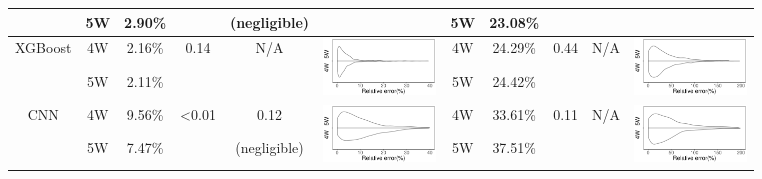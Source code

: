 \begin{landscape}
\begin{table}[htbp]
{\begin{tabular}{|c|c|c|c|c|c|c|c|c|c|c|}
\cline{2-3}\cline{7-8}          & \multirow{1}[5]{*}{5W}    & \multirow{1}[5]{*}{2.90\%} &       & (negligible) &       & \multirow{1}[5]{*}{5W}    & \multirow{1}[5]{*}{23.08\%} &       &       &  \\[4.5mm]
    \hline
    \multirow{2}[9]{*}{XGBoost} & \multirow{1}[5]{*}{4W}    & \multirow{1}[5]{*}{2.16\%} & \multirow{2}[9]{*}{0.14} & \multirow{2}[9]{*}{N/A} & \multirow{2}[4]{*}{\includegraphics[height=15mm,width=30mm]{openmrs_xgboost.pdf}} & \multirow{1}[5]{*}{4W}    & \multirow{1}[5]{*}{24.29\%} & \multirow{2}[9]{*}{0.44} & \multirow{2}[9]{*}{N/A} & \multirow{2}[4]{*}{\includegraphics[height=15mm,width=30mm]{jms_xgboost.pdf}} \\[4.5mm]
\cline{2-3}\cline{7-8}          & \multirow{1}[5]{*}{5W}    & \multirow{1}[5]{*}{2.11\%} &       &       &       & \multirow{1}[5]{*}{5W}    & \multirow{1}[5]{*}{24.42\%} &       &       &  \\[4.5mm]
    \hline
    \multirow{2}[9]{*}{CNN} & \multirow{1}[5]{*}{4W}    & \multirow{1}[5]{*}{9.56\%} & \multirow{2}[9]{*}{\textless 0.01} & \multirow{1}[10]{*}{0.12} & \multirow{2}[4]{*}{\includegraphics[height=15mm,width=30mm]{openmrs_cnn.pdf}} & \multirow{1}[5]{*}{4W}    & \multirow{1}[5]{*}{33.61\%} & \multirow{2}[9]{*}{0.11} & \multicolumn{1}{c|}{\multirow{2}[9]{*}{N/A}} & \multirow{2}[4]{*}{\includegraphics[height=15mm,width=30mm]{jms_cnn.pdf}} \\[4.5mm]
\cline{2-3}\cline{7-8}          & \multirow{1}[5]{*}{5W}    & \multirow{1}[5]{*}{7.47\%} &       & (negligible) &       & \multirow{1}[5]{*}{5W}    & \multirow{1}[5]{*}{37.51\%} &       &       &  \\[4.5mm]
    \hline

\end{tabular}}
\end{table}
\end{landscape}
